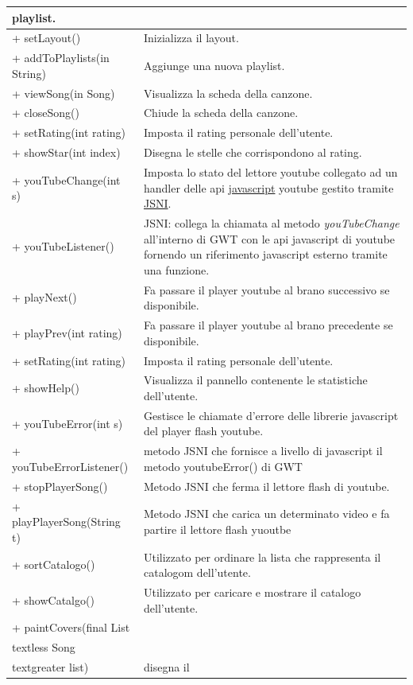 \begin{longtable}{|p{}|p{}|}
playlist.\\\hline 
+ setLayout() & Inizializza il layout.\\\hline
+ addToPlaylists(in String) & Aggiunge una nuova playlist.\\\hline 
+ viewSong(in Song) & Visualizza la scheda della canzone.\\\hline
+ closeSong() & Chiude la scheda della canzone.\\\hline
+ setRating(int rating) & Imposta il rating personale dell'utente.\\\hline
+ showStar(int index) & Disegna le stelle che corrispondono al rating.\\\hline
+ youTubeChange(int s) & Imposta lo stato del lettore youtube collegato
ad un handler delle api \underline{javascript} youtube gestito tramite
\underline{JSNI}.\\\hline + youTubeListener() & JSNI: collega la chiamata al
metodo \emph{youTubeChange} all'interno di GWT con le api javascript di
youtube fornendo un riferimento javascript esterno tramite una funzione.\\\hline
+ playNext() & Fa passare il player youtube al brano successivo se
disponibile.\\\hline
+ playPrev(int rating) & Fa passare il player youtube al brano
precedente se disponibile.\\\hline
+ setRating(int rating) & Imposta il rating personale dell'utente.\\\hline
+ showHelp() & Visualizza il pannello contenente le statistiche
dell'utente.\\\hline
+ youTubeError(int s) & Gestisce le chiamate d'errore delle librerie
javascript del player flash youtube.\\\hline
+ youTubeErrorListener() & metodo JSNI che fornisce a livello di
javascript il metodo youtubeError() di GWT\\\hline
+ stopPlayerSong() & Metodo JSNI che ferma il lettore flash di youtube.\\\hline
+ playPlayerSong(String t) & Metodo JSNI che carica un determinato video e fa
partire il lettore flash yuoutbe\\\hline
+ sortCatalogo() & Utilizzato per ordinare la lista che rappresenta il
catalogom dell'utente.\\\hline
+ showCatalgo() & Utilizzato per caricare e mostrare il catalogo
dell'utente.\\\hline
+ paintCovers(final List\\textless Song\\textgreater list) & disegna il

\end{longtable}
